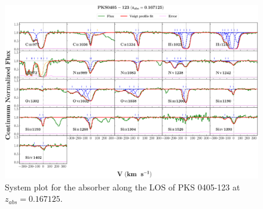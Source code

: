   
  
  \newpage
  
  \begin{landscape}
  
  \begin{figure}
      \centering
      \vspace{-20mm}
      \hspace*{-35mm}
      \includegraphics[width=1.25\linewidth]{System-Plots/PKS0405-123_z=0.167125_sys_plot.png}
      \caption{System plot for the absorber along the LOS of PKS 0405-123 at $z_{abs} = 0.167125$. }
  \end{figure}
  
  \end{landscape}
  
